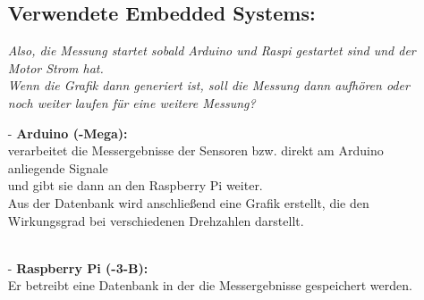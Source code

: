 \documentclass[12pt]{article}
\begin{document}
\begin{itemize}
\subsection*{Verwendete Embedded Systems:}
\textit{Also, die Messung startet sobald Arduino und Raspi gestartet sind und der Motor Strom hat. \\
				Wenn die Grafik dann generiert ist, soll die Messung dann aufhören oder noch weiter laufen für eine weitere Messung?}
\item[-]\textbf{Arduino (-Mega):}\\
verarbeitet die Messergebnisse der Sensoren bzw. direkt am Arduino anliegende Signale \\
und gibt sie dann an den Raspberry Pi weiter.\\
Aus der Datenbank wird anschließend eine Grafik erstellt, die den Wirkungsgrad bei verschiedenen Drehzahlen darstellt.\\\\ 

\item[-]\textbf{Raspberry Pi (-3-B):}\\
Er betreibt eine Datenbank in der die Messergebnisse gespeichert werden.\\


\end{itemize}
\end{document}
